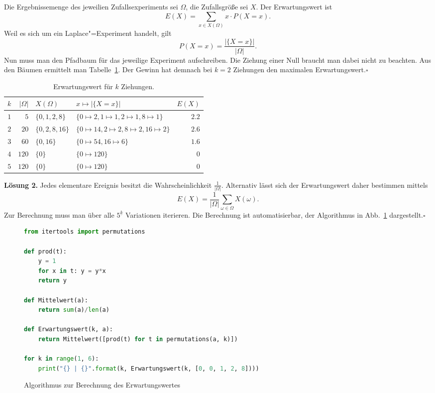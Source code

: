 \documentclass[a4paper,10pt,fleqn,twoside]{scrartcl}
\numberwithin{equation}{section}
\newcommand{\strong}[1]{{\normalfont\sffamily\bfseries #1}}
\renewcommand{\qedsymbol}{\ensuremath{\square}}
\theoremstyle{Aufgabe}
\begin{document}
Die Ergebnissemenge des jeweilien Zufallsexperiments sei $\Omega$,
die Zufallsgröße sei $X$. Der Erwartungswert ist
\[E(X) = \!\!\sum_{x\in X(\Omega)}\!\! x\cdot P(X=x).\]
Weil es sich um ein Laplace"=Experiment handelt, gilt
\[P(X=x) = \frac{|\{X=x\}|}{|\Omega|}.\]
Nun muss man den Pfadbaum für das jeweilige Experiment aufschreiben.
Die Ziehung einer Null braucht man dabei nicht zu beachten.
Aus den Bäumen ermittelt man Tabelle~\ref{tab:Produkt-Gewinn}.
Der Gewinn hat demnach bei $k=2$ Ziehungen den maximalen
Erwartungswert.\;\qedsymbol
\begin{table}
\center
\begin{tabular}{rrllr}
\toprule
$k$ & $|\Omega|$ & $X(\Omega)$ & $x\mapsto |\{X=x\}|$ & $E(X)$\\
\midrule
$1$ & $5$ & $\{0,1,2,8\}$ & $\{0\mapsto 2,1\mapsto 1,2\mapsto 1,8\mapsto 1\}$ & $2.2$\\
$2$ & $20$ & $\{0,2,8,16\}$ & $\{0\mapsto 14,2\mapsto 2,8\mapsto 2,16\mapsto 2\}$ & $2.6$\\
$3$ & $60$ & $\{0,16\}$ & $\{0\mapsto 54,16\mapsto 6\}$ & $1.6$\\
$4$ & $120$ & $\{0\}$ & $\{0\mapsto 120\}$ & $0$ \\
$5$ & $120$ & $\{0\}$ & $\{0\mapsto 120\}$ & $0$\\
\bottomrule
\end{tabular}
\caption{Erwartungswert für $k$ Ziehungen.}
\label{tab:Produkt-Gewinn}
\end{table}

\strong{Lösung 2.} Jedes elementare Ereignis besitzt die
Wahrscheinlichkeit $\tfrac{1}{|\Omega|}$. Alternativ lässt sich der
Erwartungswert daher bestimmen mittels
\[E(X) = \frac{1}{|\Omega|}\sum_{\omega\in\Omega} X(\omega).\]
Zur Berechnung muss man über alle $5^{\underline k}$ Variationen
iterieren. Die Berechnung ist automatisierbar, der Algorithmus in
Abb.~\ref{fig:Erwartungswerte} dargestellt.\;\qedsymbol

\begin{figure}[b!]
\begin{lstlisting}[language=Python]
from itertools import permutations

def prod(t):
    y = 1
    for x in t: y = y*x
    return y

def Mittelwert(a):
    return sum(a)/len(a)

def Erwartungswert(k, a):
    return Mittelwert([prod(t) for t in permutations(a, k)])

for k in range(1, 6):
    print("{} | {}".format(k, Erwartungswert(k, [0, 0, 1, 2, 8])))
\end{lstlisting}
\caption{Algorithmus zur Berechnung des Erwartungswertes}
\label{fig:Erwartungswerte}
\end{figure}
\end{document}
